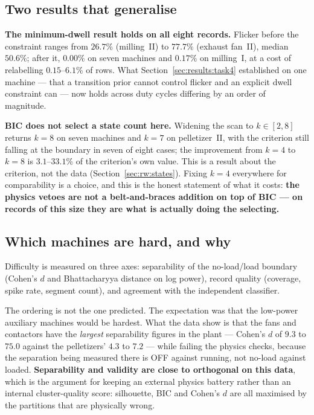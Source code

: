 \subsection{Two results that generalise}
\label{sec:multimachine:general}

\textbf{The minimum-dwell result holds on all eight records.} Flicker
before the constraint ranges from $26.7\%$ (milling~II) to $77.7\%$
(exhaust fan~II), median $50.6\%$; after it, $0.00\%$ on seven machines
and $0.17\%$ on milling~I, at a cost of relabelling $0.15$--$6.1\%$ of
rows. What Section~\ref{sec:results:task4} established on one machine
--- that a transition prior cannot control flicker and an explicit
dwell constraint can --- now holds across duty cycles differing by an
order of magnitude.

\textbf{BIC does not select a state count here.} Widening the scan to
$k\in[2,8]$ returns $k=8$ on seven machines and $k=7$ on pelletizer~II,
with the criterion still falling at the boundary in seven of eight
cases; the improvement from $k=4$ to $k=8$ is $3.1$--$33.1\%$ of the
criterion's own value. This is a result about the criterion, not the
data (Section~\ref{sec:rw:states}). Fixing $k=4$ everywhere for
comparability is a choice, and this is the honest statement of what it
costs: \textbf{the physics vetoes are not a belt-and-braces addition on
top of BIC --- on records of this size they are what is actually doing
the selecting.}

\subsection{Which machines are hard, and why}
\label{sec:multimachine:difficulty}

Difficulty is measured on three axes: separability of the no-load/load
boundary (Cohen's $d$ and Bhattacharyya distance on log power), record
quality (coverage, spike rate, segment count), and agreement with the
independent classifier.

The ordering is not the one predicted. The expectation was that the
low-power auxiliary machines would be hardest. What the data show is
that the fans and contactors have the \emph{largest} separability
figures in the plant --- Cohen's $d$ of $9.3$ to $75.0$ against the
pelletizers' $4.3$ to $7.2$ --- while failing the physics checks,
because the separation being measured there is OFF against running, not
no-load against loaded. \textbf{Separability and validity are close to
orthogonal on this data}, which is the argument for keeping an external
physics battery rather than an internal cluster-quality score:
silhouette, BIC and Cohen's $d$ are all maximised by the partitions that
are physically wrong.

